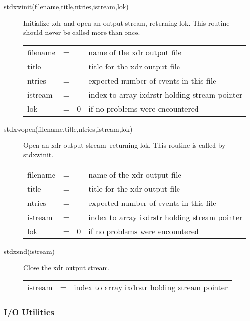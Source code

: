 \begin{description}
\item[stdxwinit(filename,title,ntries,istream,lok)]
 Initialize xdr and open an output stream, returning lok.
 This routine should never be called more than once.

\begin{tabular}{lcll}
filename & = &  & name of the xdr output file \\
title & = &  & title for the xdr output file \\
ntries & = &  & expected number of events in this file \\
istream & = &  & index to array ixdrstr holding stream pointer \\
lok  & = & 0   & if no problems were encountered \\
\end{tabular}

\item[stdxwopen(filename,title,ntries,istream,lok)]
 Open an xdr output stream, returning lok.
 This routine is called by stdxwinit.

\begin{tabular}{lcll}
filename & = &  & name of the xdr output file \\
title & = &  & title for the xdr output file \\
ntries & = &  & expected number of events in this file \\
istream & = &  & index to array ixdrstr holding stream pointer \\
lok  & = & 0  & if no problems were encountered \\
\end{tabular}

\item[stdxend(istream)]
 Close the xdr output stream.

\begin{tabular}{lcl}
istream & = & index to array ixdrstr holding stream pointer \\
\end{tabular}

\end{description}

\subsubsection{I/O Utilities}

